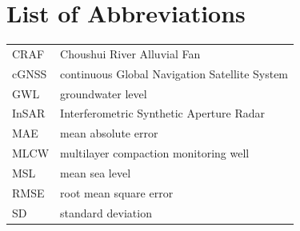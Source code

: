 \section*{List of Abbreviations}

\noindent
\begin{tabularx}{\textwidth}{@{}lX@{}}
  CRAF  & Choushui River Alluvial Fan \\
  cGNSS & continuous Global Navigation Satellite System \\
  GWL   & groundwater level \\
  InSAR & Interferometric Synthetic Aperture Radar \\
  MAE   & mean absolute error \\
  MLCW  & multilayer compaction monitoring well \\
  MSL   & mean sea level \\
  RMSE  & root mean square error \\
  SD    & standard deviation \\
\end{tabularx}
